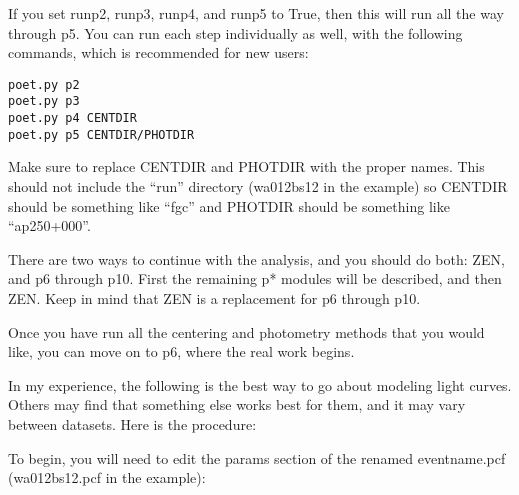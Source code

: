 \documentclass[letterpaper,12pt]{article}
\begin{document}
If you set runp2, runp3, runp4, and runp5 to True, then this will run
all the way through p5. You can run each step individually as well,
with the following commands, which is recommended for new users:

\begin{verbatim}
poet.py p2
poet.py p3
poet.py p4 CENTDIR
poet.py p5 CENTDIR/PHOTDIR
\end{verbatim}

Make sure to replace CENTDIR and PHOTDIR with the proper names.  This
should not include the ``run'' directory (wa012bs12 in the example) so
CENTDIR should be something like ``fgc'' and PHOTDIR should be
something like ``ap250+000''.

There are two ways to continue with the analysis, and you should
do both:  ZEN, and p6 through p10. First the remaining p* modules
will be described, and then ZEN. Keep in mind that ZEN
is a replacement for p6 through p10.

Once you have run all the centering and photometry methods that you
would like, you can move on to p6, where the real work begins.

In my experience, the following is the best way to go about modeling
light curves. Others may find that something else works best for them,
and it may vary between datasets. Here is the procedure:

To begin, you will need to edit the params section of the renamed
eventname.pcf (wa012bs12.pcf in the example):
\end{document}
